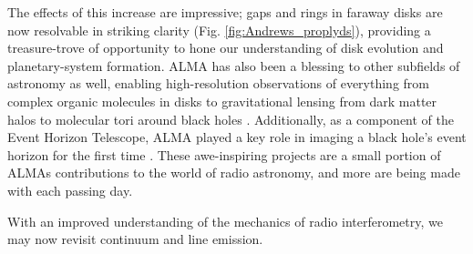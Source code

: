 \begin{figure}[htp]
  \hspace*{\fill}%
  \hfill%
  \hspace*{\fill}%
\end{figure}


The effects of this increase are impressive; gaps and rings in faraway disks are now resolvable in striking clarity (Fig. \ref{fig:Andrews_proplyds}), providing a treasure-trove of opportunity to hone our understanding of disk evolution and planetary-system formation. ALMA has also been a blessing to other subfields of astronomy as well, enabling high-resolution observations of everything from complex organic molecules in disks \citep{Walsh2016,Podio2019} to gravitational lensing from dark matter halos \citep{Herrera-Martin2019} to molecular tori around black holes \citep{Combes2018}. Additionally, as a component of the Event Horizon Telescope, ALMA played a key role in imaging a black hole's event horizon for the first time \citep{EHTCollab2019}. These awe-inspiring projects are a small portion of ALMAs contributions to the world of radio astronomy, and more are being made with each passing day.


With an improved understanding of the mechanics of radio interferometry, we may now revisit continuum and line emission.






